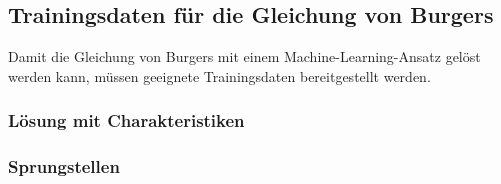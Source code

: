%
%
%
\subsection{Trainingsdaten für die Gleichung von Burgers}
Damit die Gleichung von Burgers mit einem Machine-Learning-Ansatz gelöst
werden kann, müssen geeignete Trainingsdaten bereitgestellt werden.


\subsubsection{Lösung mit Charakteristiken}

\subsubsection{Sprungstellen}


